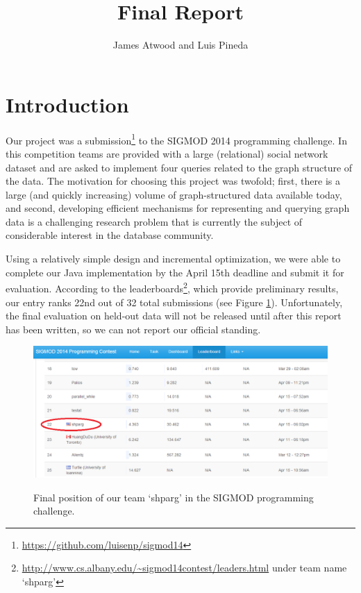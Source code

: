 \documentclass{article}
\title{Final Report}
\author{
James Atwood and Luis Pineda \\ %
}
\begin{document}
\maketitle

\section{Introduction}
Our project was a
submission\footnote{\url{https://github.com/luisenp/sigmod14}} to the
SIGMOD 2014 programming challenge.  In this competition teams are
provided with a large (relational) social network dataset and are
asked to implement four queries related to the graph structure of the
data. The motivation for choosing this project was
twofold; first, there is a large (and quickly increasing) volume of
graph-structured data available today, and second, developing
efficient mechanisms for representing and querying graph data is a
challenging research problem that is currently the subject of
considerable interest in the database community.

Using a relatively simple design and incremental optimization,
we were able to complete our Java implementation by the April 15th
deadline and submit it for evaluation.  According to the
leaderboards\footnote{\url{http://www.cs.albany.edu/~sigmod14contest/leaders.html}
  under team name `shparg'}, which provide preliminary results, our
entry ranks 22nd out of 32 total submissions (see Figure
\ref{fig:leader}).  Unfortunately, the final evaluation on held-out
data will not be released until after this report has been written, so
we can not report our official standing.



\begin{figure}[t]
  \centering
  \includegraphics[scale=0.45]{img/leaderboard.png}
  \label{fig:leader}
  \caption{Final position of our team `shparg' in the SIGMOD programming challenge.}
\end{figure}
\end{document}

